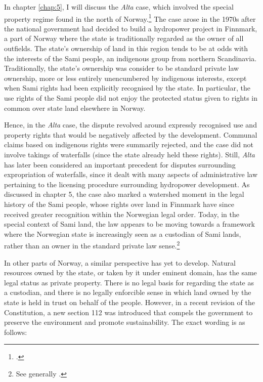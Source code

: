 In chapter \ref{chap:5}, I will discuss the {\it Alta} case, which involved the special property regime found in the north of Norway.\footnote{\cite{alta82}.} The case arose in the 1970s after the national government had decided to build a hydropower project in Finnmark, a part of Norway where the state is traditionally regarded as the owner of all outfields. The state's ownership of land in this region tends to be at odds with the interests of the Sami people, an indigenous group from northern Scandinavia. Traditionally, the state's ownership was consider to be standard private law ownership, more or less entirely unencumbered by indigenous interests, except when Sami rights had been explicitly recognised by the state. In particular, the use rights of the Sami people did not enjoy the protected status given to rights in common over state land elsewhere in Norway.%

Hence, in the {\it Alta} case, the dispute revolved around expressly recognised use and property rights that would be negatively affected by the development. Communal claims based on indigenous rights were summarily rejected, and the case did not involve takings of waterfalls (since the state already held these rights). Still, {\it Alta} has later been considered an important precedent for disputes surrounding expropriation of waterfalls, since it dealt with many aspects of administrative law pertaining to the licensing procedure surrounding hydropower development. As discussed in chapter 5, the case also marked a watershed moment in the legal history of the Sami people, whose rights over land in Finnmark have since received greater recognition within the Norwegian legal order. Today, in the special context of Sami land, the law appears to be moving towards a framework where the Norwegian state is increasingly seen as a custodian of Sami lands, rather than an owner in the standard private law sense.\footnote{See generally \cite{ravna05,bull07,ravna12s}.}

In other parts of Norway, a similar perspective has yet to develop. Natural resources owned by the state, or taken by it under eminent domain, has the same legal status as private property. There is no legal basis for regarding the state as a custodian, and there is no legally enforcible sense in which land owned by the state is held in trust on behalf of the people. However, in a recent revision of the Constitution, a new section 112 was introduced that compels the government to preserve the environment and promote sustainability. The exact wording is as follows:

